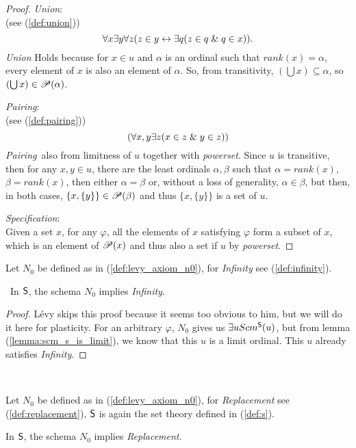 \begin{proof}
\item \emph{Union}:\\
(see (\ref{def:union}))
\begin{equation}
\forall x \exists y \forall z (z \in y \leftrightarrow \exists q( z \in q \mathrel{\&} q \in x)).
\end{equation}
\emph{Union} Holds because for $x \in u$ and $\alpha$ is an ordinal such that $rank(x) = \alpha$, every element of $x$ is also an element of $\alpha$. So, from transitivity, $(\bigcup x) \subseteq \alpha$, so $(\bigcup x) \in \mathscr{P} (\alpha)$.

\item \emph{Pairing}:\\
(see (\ref{def:pairing}))
\begin{equation}
(\forall x, y \exists z (x \in z \et y \in z)) %
\end{equation}
\emph{Pairing} also from limitness of $u$ together with \emph{powerset}. Since $u$ is transitive, then for any $x, y \in u$, there are the least ordinals $\alpha, \beta$ such that $\alpha = rank(x)$, $\beta = rank(x)$, then either $\alpha = \beta$ or, without a loss of generality, $\alpha \in \beta$, but then, in both cases, $\{x, \{y\}\} \in \mathscr{P} (\beta)$ and thus $\{x, \{y\}\}$ is a set of $u$.


\item \emph{Specification}: \\
Given a set $x$, for any $\varphi$, all the elements of $x$ satisfying $\varphi$ form a subset of $x$, which is an element of $\mathscr{P} (x)$ and thus also a set if $u$ by \emph{powerset}.
\ece
\end{proof}

Let $N_0$ be defined as in (\ref{def:levy_axiom_n0}), for \emph{Infinity} see (\ref{def:infinity}).
\begin{theorem}\
In $\sf{S}$, the schema $N_0$ implies \emph{Infinity}.
\end{theorem}

\begin{proof}
Lévy skips this proof because it seems too obvious to him, but we will do it here for plasticity.
For an arbitrary $\varphi$, $N_0$ gives us $\exists u Scm^{\sf{S}}(u)$, but from lemma (\ref{lemma:scm_s_is_limit}), we know that this $u$ is a limit ordinal. This $u$ already satisfies \emph{Infinity}.
\end{proof}

\

Let $N_0$ be defined as in (\ref{def:levy_axiom_n0}), for \emph{Replacement} see (\ref{def:replacement}), $\sf{S}$ is again the set theory defined in (\ref{def:s}).
\begin{theorem}
In $\sf{S}$, the schema $N_0$ implies \emph{Replacement}.
\end{theorem}

